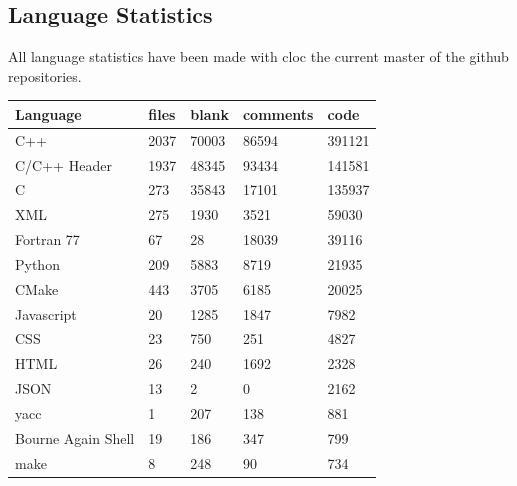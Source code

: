 \begin{appendix}
\section{Language Statistics}

All language statistics have been made with cloc \cite{CLOC} the current master of the github repositories.

\begin{table}[htbp]
    \centering
    \caption{Paraview, language statistic}
    \sffamily 
    \begin{longtable}{ l|l|l|l|l }
        \hline
        \textbf{Language}              &\textbf{files} &\textbf{blank} &\textbf{comments} & \textbf{code} \\
        \hline
        C++                            &2037          &70003         &86594         & 391121\\
        C/C++ Header                   &1937          &48345         & 93434        & 141581\\
        C                              & 273          &35843         & 17101        & 135937\\
        XML                            & 275          & 1930         &  3521        &  59030\\
        Fortran 77                     &  67          &   28         & 18039        &  39116\\
        Python                         & 209          & 5883         &  8719        &  21935\\
        CMake                          & 443          & 3705         &  6185        &  20025\\
        Javascript                     &  20          & 1285         &  1847        &   7982\\
        CSS                            &  23          &  750         &   251        &   4827\\
        HTML                           &  26          &  240         &  1692        &   2328\\
        JSON                           &  13          &    2         &     0        &   2162\\
        yacc                           &   1          &  207         &   138        &    881\\
        Bourne Again Shell             &  19          &  186         &   347        &    799\\
        make                           &   8          &  248         &    90        &    734\\

\end{longtable}
\end{table}
\end{appendix}
